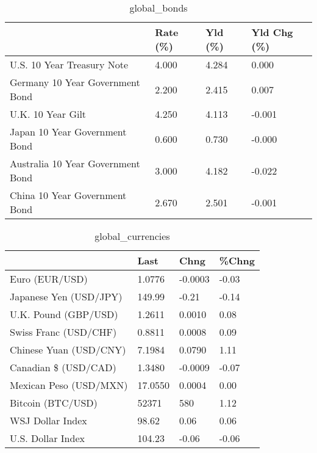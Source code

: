 \documentclass{article}%
\begin{document}
%


\begin{table}[htbp]%
\caption{global\_bonds}%
\centering%
\begin{adjustbox}{width=1\textwidth}%
\begin{tabular}{llll}
\toprule
                                  & Rate (\%) & Yld (\%) & Yld Chg (\%) \\
\midrule
       U.S. 10 Year Treasury Note &    4.000 &   4.284 &       0.000 \\
  Germany 10 Year Government Bond &    2.200 &   2.415 &       0.007 \\
                U.K. 10 Year Gilt &    4.250 &   4.113 &      -0.001 \\
    Japan 10 Year Government Bond &    0.600 &   0.730 &      -0.000 \\
Australia 10 Year Government Bond &    3.000 &   4.182 &      -0.022 \\
    China 10 Year Government Bond &    2.670 &   2.501 &      -0.001 \\
\bottomrule
\end{tabular}
%
\end{adjustbox}%
\end{table}

%


\begin{table}[htbp]%
\caption{global\_currencies}%
\centering%
\begin{adjustbox}{width=1\textwidth}%
\begin{tabular}{llll}
\toprule
                       &    Last &    Chng & \%Chng \\
\midrule
        Euro (EUR/USD) &  1.0776 & -0.0003 & -0.03 \\
Japanese Yen (USD/JPY) &  149.99 &   -0.21 & -0.14 \\
  U.K. Pound (GBP/USD) &  1.2611 &  0.0010 &  0.08 \\
 Swiss Franc (USD/CHF) &  0.8811 &  0.0008 &  0.09 \\
Chinese Yuan (USD/CNY) &  7.1984 &  0.0790 &  1.11 \\
  Canadian \$ (USD/CAD) &  1.3480 & -0.0009 & -0.07 \\
Mexican Peso (USD/MXN) & 17.0550 &  0.0004 &  0.00 \\
     Bitcoin (BTC/USD) &   52371 &     580 &  1.12 \\
      WSJ Dollar Index &   98.62 &    0.06 &  0.06 \\
     U.S. Dollar Index &  104.23 &   -0.06 & -0.06 \\
\bottomrule
\end{tabular}
%
\end{adjustbox}%
\end{table}
\end{document}
